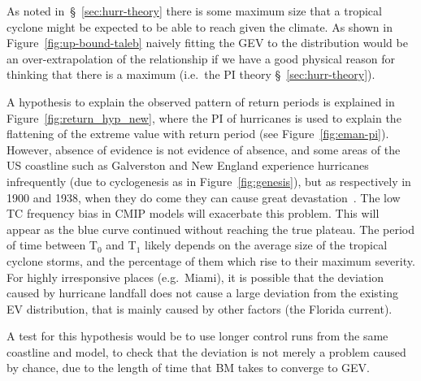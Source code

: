 As noted in~§~\ref{sec:hurr-theory} there is some maximum size
that a tropical cyclone might be expected to be able to reach given
the climate.
As shown in Figure~\ref{fig:up-bound-taleb} naively fitting
the GEV to the distribution would be an over-extrapolation of
the relationship if we have a good physical reason for
thinking that there is a maximum
(i.e.~the PI theory §~\ref{sec:hurr-theory}).

A hypothesis to explain the observed pattern of return periods is explained in
Figure~\ref{fig:return_hyp_new}, where the PI of hurricanes is used to
explain the flattening of the extreme
value with return period (see Figure~\ref{fig:eman-pi}).
However, absence of evidence is not
 evidence of absence, and some areas of the US
coastline such as Galverston and New England experience hurricanes infrequently
(due to cyclogenesis as in Figure~\ref{fig:genesis}),
but as respectively in 1900 and 1938,
when they do come they can cause great devastation~\cite{emanuel2005divine}.
The low TC frequency bias in CMIP models will exacerbate this problem.
This will appear as the blue curve continued without reaching the true plateau.
The period of time between T$_0$ and T$_1$ likely depends
 on the average size of the tropical cyclone storms,
and the percentage of them which rise to their maximum severity.
For highly irresponsive places (e.g.~Miami),
 it is possible that the deviation caused
by hurricane landfall does not cause a large
deviation from the existing EV distribution,
that is mainly caused by other factors (the Florida current).

A test for this hypothesis would be to use longer control runs from the same
coastline and model, to check that the deviation is not merely a problem caused
by chance, due to the length of time that BM takes to converge to GEV.









\FloatBarrier
